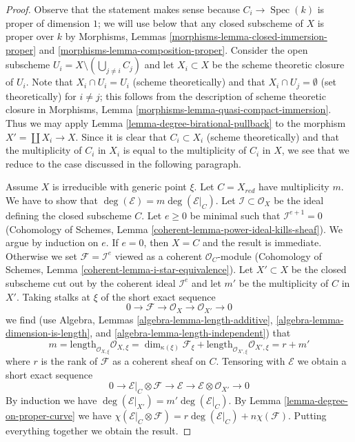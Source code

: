 \documentclass[10pt,a4paper]{amsart}
\theoremstyle{plain}
\theoremstyle{definition}
\theoremstyle{remark}
\numberwithin{equation}{subsection}
\def\Spec{\mathop{\mathrm{Spec}}}
\begin{document}
\begin{proof}
Observe that the statement makes sense because $C_i \to \Spec(k)$
is proper of dimension $1$; we will use below that any closed subscheme
of $X$ is proper over $k$ by Morphisms, Lemmas
\ref{morphisms-lemma-closed-immersion-proper} and
\ref{morphisms-lemma-composition-proper}. Consider the open subscheme
$U_i = X \setminus (\bigcup_{j \not = i} C_j)$ and let $X_i \subset X$
be the scheme theoretic closure of $U_i$. Note that $X_i \cap U_i = U_i$
(scheme theoretically) and that $X_i \cap U_j = \emptyset$
(set theoretically) for $i \not = j$; this follows from the description
of scheme theoretic closure in
Morphisms, Lemma \ref{morphisms-lemma-quasi-compact-immersion}.
Thus we may apply Lemma \ref{lemma-degree-birational-pullback} to the morphism
$X' = \coprod X_i \to X$. Since it is clear that $C_i \subset X_i$
(scheme theoretically) and that the multiplicity of $C_i$ in $X_i$ is equal
to the multiplicity of $C_i$ in $X$, we see that we reduce to the case
discussed in the following paragraph.

\medskip\noindent
Assume $X$ is irreducible with generic point $\xi$. Let
$C = X_{red}$ have multiplicity $m$.
We have to show that $\deg(\mathcal{E}) = m \deg(\mathcal{E}|_C)$.
Let $\mathcal{I} \subset \mathcal{O}_X$ be the ideal defining the closed
subscheme $C$. Let $e \geq 0$ be minimal such that $\mathcal{I}^{e + 1} = 0$
(Cohomology of Schemes, Lemma \ref{coherent-lemma-power-ideal-kills-sheaf}).
We argue by induction on $e$. If $e = 0$, then $X = C$ and the result
is immediate. Otherwise we set $\mathcal{F} = \mathcal{I}^e$ viewed as
a coherent $\mathcal{O}_C$-module (Cohomology of Schemes, Lemma
\ref{coherent-lemma-i-star-equivalence}).
Let $X' \subset X$ be the closed subscheme cut out by the
coherent ideal $\mathcal{I}^e$ and let $m'$ be the multiplicity
of $C$ in $X'$. Taking stalks at $\xi$ of the short exact sequence
$$
0 \to \mathcal{F} \to \mathcal{O}_X \to \mathcal{O}_{X'} \to 0
$$
we find (use Algebra, Lemmas \ref{algebra-lemma-length-additive},
\ref{algebra-lemma-dimension-is-length}, and
\ref{algebra-lemma-length-independent}) that
$$
m = \text{length}_{\mathcal{O}_{X, \xi}} \mathcal{O}_{X, \xi}
= \dim_{\kappa(\xi)} \mathcal{F}_\xi +
\text{length}_{\mathcal{O}_{X', \xi}} \mathcal{O}_{X', \xi}
= r + m'
$$
where $r$ is the rank of $\mathcal{F}$ as a coherent sheaf on $C$.
Tensoring with $\mathcal{E}$ we obtain a short exact sequence
$$
0 \to \mathcal{E}|_C \otimes \mathcal{F} \to \mathcal{E} \to
\mathcal{E} \otimes \mathcal{O}_{X'} \to 0
$$
By induction we have
$\deg(\mathcal{E}|_{X'}) = m' \deg(\mathcal{E}|_C)$.
By Lemma \ref{lemma-degree-on-proper-curve} we have
$\chi(\mathcal{E}|_C \otimes \mathcal{F}) =
r \deg(\mathcal{E}|_C) + n \chi(\mathcal{F})$.
Putting everything together we obtain the result.
\end{proof}
\end{document}
